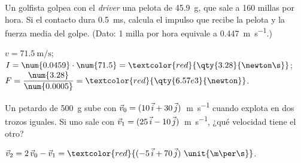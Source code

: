 \begin{exercise}
    Un golfista golpea con el \textit{driver} una pelota de \qty{45.9}{\g}, que sale a 160 millas por hora. Si el contacto dura
    \qty{0.5}{\milli\s}, calcula el impulso que recibe la pelota y la fuerza media del golpe. (Dato: 1 milla por hora equivale a
    \qty{0.447}{\m\per\s}.)
    \begin{solu}
        \(v = \qty{71.5}{\m\per\s}\); \(I = \num{0.0459} \cdot \num{71.5} = \textcolor{red}{\qty{3.28}{\newton\s}}\);
        \(F = \dfrac{\num{3.28}}{\num{0.0005}} = \textcolor{red}{\qty{6.57e3}{\newton}}\).
    \end{solu}
\end{exercise}

\begin{exercise}
    Un petardo de \qty{500}{\g} sube con \(\vec{v}_0 = (10\,\vec{i} + 30\,\vec{j})\)~\unit{\m\per\s} cuando explota en dos trozos iguales.
    Si uno sale con \(\vec{v}_1 = (25\,\vec{i} - 10\,\vec{j})\)~\unit{\m\per\s}, ¿qué velocidad tiene el otro?
    \begin{solu}
        \(\vec{v}_2 = 2\,\vec{v}_0 - \vec{v}_1 = \textcolor{red}{(-5\,\ivec + 70\,\jvec)~\unit{\m\per\s}}\).
    \end{solu}
\end{exercise}
